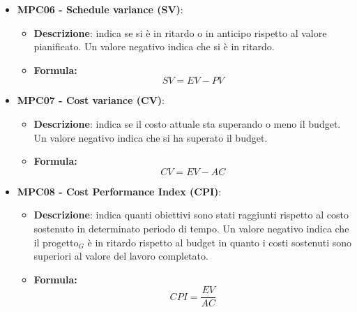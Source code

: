 \documentclass[10pt]{article}
\begin{document}
\begin{justify}
\begin{itemize}
\begin{itemize}
        \end{itemize}
    \item \textbf{MPC06 - Schedule variance (SV)}:
    \begin{itemize}
        \item   \textbf{Descrizione}: indica se si è in ritardo o in anticipo rispetto al valore pianificato. Un valore negativo indica che si è in ritardo.
        \item   \textbf{Formula:}
            \[
            SV = EV - PV
            \]
    \end{itemize}
    \item \textbf{MPC07 - Cost variance (CV)}:
    \begin{itemize}
        \item   \textbf{Descrizione}: indica se il costo attuale sta superando o meno il budget. Un valore negativo indica che si ha superato il budget.
        \item   \textbf{Formula:}
            \[
            CV = EV - AC
            \]
    \end{itemize}
    \item \textbf{MPC08 - Cost Performance Index (CPI)}:
    \begin{itemize}
        \item   \textbf{Descrizione}: indica quanti obiettivi sono stati raggiunti rispetto al costo sostenuto in determinato periodo di tempo. Un valore negativo indica che il progetto$_G$ è in ritardo rispetto al budget in quanto i costi sostenuti sono superiori al valore del lavoro completato.
        \item   \textbf{Formula:}
            \[
            CPI = \frac{EV}{AC}
            \]
    \end{itemize}
\end{itemize}


\end{justify}
\end{document}
